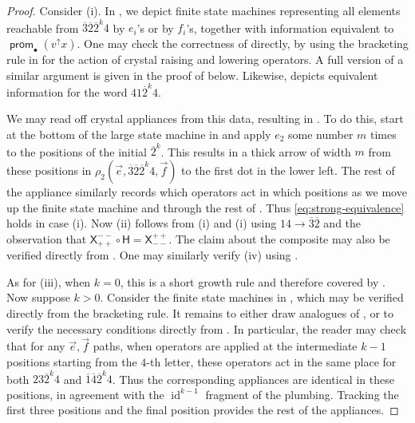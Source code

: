 \documentclass{amsart}
\theoremstyle{definition}
\theoremstyle{remark}
\numberwithin{equation}{section}
\DeclareMathOperator{\id}{id}
\DeclareMathOperator{\prom}{\mathsf{prom}}
\begin{document}
\begin{proof}
  Consider (i). In , we depict finite state machines representing all elements reachable from $\overline{3}\overline{2}\overline{2}^k4$ by $e_i$'s or by $f_i$'s, together with information equivalent to $\prom_\bullet(v^\uparrow x)$. One may check the correctness of  directly, by using the bracketing rule in  for the action of crystal raising and lowering operators. A full version of a similar argument is given in the proof of  below. Likewise,  depicts equivalent information for the word $41\overline{2}^k4$.
  
  We may read off crystal appliances from this data, resulting in . To do this, start at the bottom of the large state machine in  and apply $e_2$ some number $m$ times to the positions of the initial $\overline{2}^k$. This results in a thick arrow of width $m$ from these positions in $\rho_2(\vec{e}, \overline{3}\overline{2}\overline{2}^k4, \vec{f})$ to the first dot in the lower left. The rest of the appliance similarly records which operators act in which positions as we move up the finite state machine and through the rest of . Thus \eqref{eq:strong-equivalence} holds in case (i). Now (ii) follows from (i) and (i) using $14 \to \overline{3}\overline{2}$ and the observation that $\mathsf{X}^{--}_{++} \circ \mathsf{H} = \mathsf{X}^{++}_{--}$. The claim about the composite may also be verified directly from . One may similarly verify (iv) using .
  
  As for (iii), when $k=0$, this is a short growth rule and therefore covered by . Now suppose $k > 0$. Consider the finite state machines in , which may be verified directly from the bracketing rule. It remains to either draw analogues of , or to verify the necessary conditions directly from . In particular, the reader may check that for any $\vec{e}, \vec{f}$ paths, when operators are applied at the intermediate $k-1$ positions starting from the $4$-th letter, these operators act in the same place for both $23\overline{2}^k4$ and $\overline{1}\overline{4}\overline{2}^k4$. Thus the corresponding appliances are identical in these positions, in agreement with the $\id^{k-1}$ fragment of the plumbing. Tracking the first three positions and the final position provides the rest of the appliances.
\end{proof}
\end{document}
